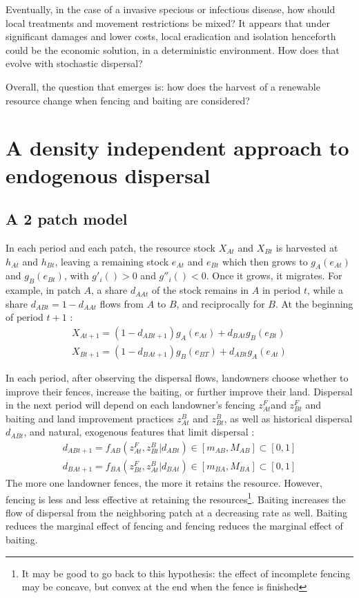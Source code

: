 \documentclass{article}
\begin{document}
Eventually, in the case of a invasive specious or infectious disease, how should local treatments and movement restrictions be mixed? It appears that under significant damages and lower costs, local eradication and isolation henceforth could be the economic solution, in a deterministic environment. How does that evolve with stochastic dispersal?

Overall, the question that emerges is: how does the harvest of a renewable resource change when fencing and baiting are considered?

\section{A density independent approach to endogenous dispersal}
\subsection{A 2 patch model}
In each period and each patch, the resource stock $X_{At}$ and $ X_{Bt}$ is harvested at $h_{At}$ and $h_{Bt}$, leaving a remaining stock $e_{At}$ and $ e_{Bt}$ which then grows to $g_A(e_{At})$ and $g_B(e_{Bt})$, with $g'_i()>0$ and $g''_i()<0$. Once it grows, it migrates. For example, in patch $A$, a share $d_{AAt}$ of the stock remains in $A$ in period $t$, while a share $d_{ABt} = 1-d_{AAt}$ flows from $A$ to $B$, and reciprocally for $B$. At the beginning of period $t+1$ : 
\begin{align}
    X_{At+1} = (1-d_{ABt+1})g_A(e_{At})+d_{BAt}g_B(e_{Bt})
    \\
    X_{Bt+1} = (1 - d_{BAt+1})g_B(e_{BT}) + d_{ABt}g_A(e_{At})
\end{align}

In each period, after observing the dispersal flows, landowners choose whether to improve their fences, increase the baiting, or further improve their land. 
Dispersal in the next period will depend on each landowner's fencing $z_{At}^F$and $z_{Bt}^F$ and baiting and land improvement practices $z_{At}^B$ and $z_{Bt}^B$, as well as historical dispersal $d_{ABt}$, and natural, exogenous features that limit dispersal : 
\begin{align}
    d_{ABt+1} = f_{AB}(z^F_{At}, z^B_{Bt}| d_{ABt}) \in [m_{AB},M_{AB}] \subset [0,1] \\
    d_{BAt+1} = f_{BA}(z^F_{Bt}, z^B_{At}| d_{BAt}) \in [m_{BA},M_{BA}] \subset [0,1]
\end{align}
The more one landowner fences, the more it retains the resource. However, fencing is less and less effective at retaining the resources\footnote{It may be good to go back to this hypothesis: the effect of incomplete fencing may be concave, but convex at the end when the fence is finished}. Baiting increases the flow of dispersal from the neighboring patch at a decreasing rate as well. Baiting reduces the marginal effect of fencing and fencing reduces the marginal effect of baiting.
\end{document}
